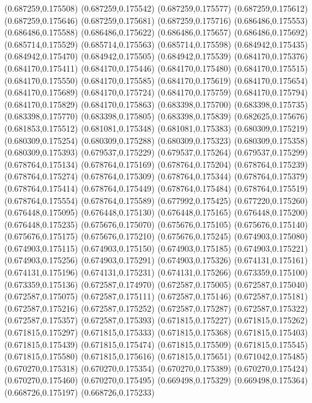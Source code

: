 (0.687259,0.175508)
(0.687259,0.175542)
(0.687259,0.175577)
(0.687259,0.175612)
(0.687259,0.175646)
(0.687259,0.175681)
(0.687259,0.175716)
(0.686486,0.175553)
(0.686486,0.175588)
(0.686486,0.175622)
(0.686486,0.175657)
(0.686486,0.175692)
(0.685714,0.175529)
(0.685714,0.175563)
(0.685714,0.175598)
(0.684942,0.175435)
(0.684942,0.175470)
(0.684942,0.175505)
(0.684942,0.175539)
(0.684170,0.175376)
(0.684170,0.175411)
(0.684170,0.175446)
(0.684170,0.175480)
(0.684170,0.175515)
(0.684170,0.175550)
(0.684170,0.175585)
(0.684170,0.175619)
(0.684170,0.175654)
(0.684170,0.175689)
(0.684170,0.175724)
(0.684170,0.175759)
(0.684170,0.175794)
(0.684170,0.175829)
(0.684170,0.175863)
(0.683398,0.175700)
(0.683398,0.175735)
(0.683398,0.175770)
(0.683398,0.175805)
(0.683398,0.175839)
(0.682625,0.175676)
(0.681853,0.175512)
(0.681081,0.175348)
(0.681081,0.175383)
(0.680309,0.175219)
(0.680309,0.175254)
(0.680309,0.175288)
(0.680309,0.175323)
(0.680309,0.175358)
(0.680309,0.175393)
(0.679537,0.175229)
(0.679537,0.175264)
(0.679537,0.175299)
(0.678764,0.175134)
(0.678764,0.175169)
(0.678764,0.175204)
(0.678764,0.175239)
(0.678764,0.175274)
(0.678764,0.175309)
(0.678764,0.175344)
(0.678764,0.175379)
(0.678764,0.175414)
(0.678764,0.175449)
(0.678764,0.175484)
(0.678764,0.175519)
(0.678764,0.175554)
(0.678764,0.175589)
(0.677992,0.175425)
(0.677220,0.175260)
(0.676448,0.175095)
(0.676448,0.175130)
(0.676448,0.175165)
(0.676448,0.175200)
(0.676448,0.175235)
(0.675676,0.175070)
(0.675676,0.175105)
(0.675676,0.175140)
(0.675676,0.175175)
(0.675676,0.175210)
(0.675676,0.175245)
(0.674903,0.175080)
(0.674903,0.175115)
(0.674903,0.175150)
(0.674903,0.175185)
(0.674903,0.175221)
(0.674903,0.175256)
(0.674903,0.175291)
(0.674903,0.175326)
(0.674131,0.175161)
(0.674131,0.175196)
(0.674131,0.175231)
(0.674131,0.175266)
(0.673359,0.175100)
(0.673359,0.175136)
(0.672587,0.174970)
(0.672587,0.175005)
(0.672587,0.175040)
(0.672587,0.175075)
(0.672587,0.175111)
(0.672587,0.175146)
(0.672587,0.175181)
(0.672587,0.175216)
(0.672587,0.175252)
(0.672587,0.175287)
(0.672587,0.175322)
(0.672587,0.175357)
(0.672587,0.175393)
(0.671815,0.175227)
(0.671815,0.175262)
(0.671815,0.175297)
(0.671815,0.175333)
(0.671815,0.175368)
(0.671815,0.175403)
(0.671815,0.175439)
(0.671815,0.175474)
(0.671815,0.175509)
(0.671815,0.175545)
(0.671815,0.175580)
(0.671815,0.175616)
(0.671815,0.175651)
(0.671042,0.175485)
(0.670270,0.175318)
(0.670270,0.175354)
(0.670270,0.175389)
(0.670270,0.175424)
(0.670270,0.175460)
(0.670270,0.175495)
(0.669498,0.175329)
(0.669498,0.175364)
(0.668726,0.175197)
(0.668726,0.175233)

